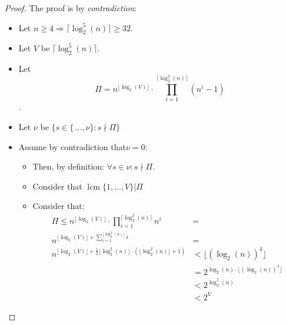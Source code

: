 \begin{proof}
    The proof is by \emph{contradiction}:
    \begin{itemize}
        \item Let $n \geq 4 \Rightarrow \lceil \operatorname{log}_{2}^{5}(n) \rceil \geq 32$.
        \item Let $V$ be $\lceil \operatorname{log}_{2}^{5}(n) \rceil$.
        \item Let \[\Pi = n^{\lfloor \operatorname{log}_{2}(V) \rfloor} \cdot \prod_{i=1}^{\lceil \operatorname{log}_{2}^{2}(n) \rceil}(n^{i} - 1) \].
        \item Let $\nu$ be $\{s \in \{\, \dots, \nu\}: s \nmid \Pi\}$
        \item Assume by contradiction that$ \nu = 0 $:
        \begin{itemize}
            \item Then, by definition: $\forall s \in \nu: s \nmid \Pi$.
            \item Consider that $\operatorname{lcm}\{1, \dots, V\} | \Pi$
            \item Consider that:
            \begin{align}
                \Pi \leq n^{\lfloor \operatorname{log}_{2}(V) \rfloor} \cdot \prod_{i=1}^{\lceil \operatorname{log}_{2}^{2}(n) \rceil} n^{i} & =\\
                n^{\lfloor \operatorname{log}_{2}(V) \rfloor + \sum_{i=1}^{\lfloor \operatorname{log}_{2}^{2}(n) \rfloor} i} & =  \\
                n^{\lfloor \operatorname{log}_{2}(V) \rfloor + \frac{1}{2} \lfloor \operatorname{log}_{2}^{2}(n) \rfloor \cdot (\lfloor \operatorname{log}_{2}^{2}(n) \rfloor + 1)}
                & < \lfloor (\operatorname{log}_{2}(n))^{4} \rfloor \\
                & = 2^{\operatorname{log}_{2}(n) \cdot \lfloor (\operatorname{log}_{2}(n))^{4} \rfloor} \\
                & < 2^{\operatorname{log}_{2}^{5}(n)} \\
                & < 2^{V}
            \end{align}


\end{itemize}
\end{itemize}
\end{proof}
